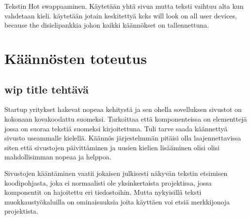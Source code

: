 \documentclass[11pt,a4paper,titlepage,oneside]{article}
\begin{document}
Tekstin Hot swappaaminen. Käytetään yhtä sivua mutta teksti vaihtuu alta kun vahdetaan kieli. \citemissing{}
käytetään jotain keskitettyä kcks will look on all user devices, because the disielipankkia johon kaikki käännökset on tallennettuna.
\medskip

































\newpage






\section{Käännösten toteutus}

\subsection{wip title tehtävä}


Startup yritykset hakevat nopeaa kehitystä ja sen ohella sovelluksen sivustot on kokonaan kovakoodattu suomeksi.
Tarkoittaa että komponenteissa on elementtejä jossa on suoraa tekstiä suomeksi kirjoitettuna.
Tuli tarve saada käännettyä sivusto useammalle kielellä.
Käännös järjestelmmän pitäisi olla laajennettavissa siten että sivustojen päivittäminen ja uusien kielien lisääminen olisi 
olisi mahdollisimman nopeaa ja helppoa.

\medskip


Sivustojen kääntäminen vaatii jokaisen julkisesti näkyvän tekstin etsimisen koodipohjasta, 
joka ei normaalisti ole yksinkertaista projektissa, jossa komponentit on hajoitettu eri tiedostoihin.
Mutta nykyisillä teksti muokkaustyökaluilla on ominaisuuksia joita käyttäen voi etsiä merkkijonoja projektista.
\end{document}
